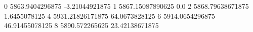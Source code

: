 0 5863.9404296875 -3.21044921875
1 5867.15087890625 0.0
2 5868.79638671875 1.6455078125
4 5931.21826171875 64.0673828125
6 5914.0654296875 46.91455078125
8 5890.572265625 23.42138671875
